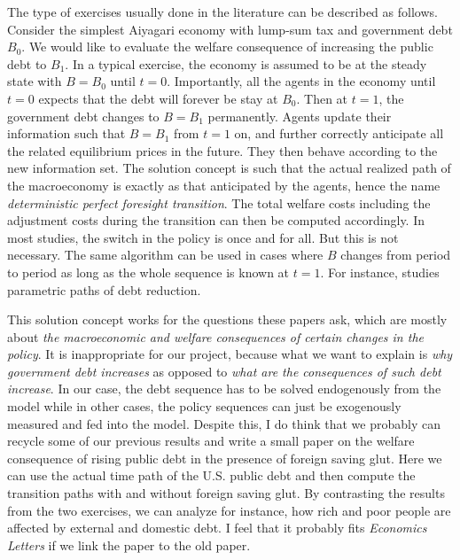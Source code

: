 \documentclass[twoside,11pt,leqno]{article}
\begin{document}
The type of exercises usually done in the literature can be described as follows. Consider the simplest Aiyagari economy with lump-sum tax and government debt $B_0$. We would like to evaluate the welfare consequence of increasing the public debt to $B_1$. In a typical exercise, the economy is assumed to be at the steady state with $B = B_0$ until $t=0$. Importantly, all the agents in the economy until $t=0$ expects that the debt will forever be stay at $B_0$. Then at $t=1$, the government debt changes to $B = B_1$ permanently. Agents update their information such that $B = B_1$ from $t=1$ on, and further correctly anticipate all the related equilibrium prices in the future. They then behave according to the new information set. The solution concept is such that the actual realized path of the macroeconomy is exactly as that anticipated by the agents, hence the name \textit{deterministic perfect foresight transition}. The total welfare costs including the adjustment costs during the transition can then be computed accordingly. In most studies, the switch in the policy is once and for all. But this is not necessary. The same algorithm can be used in cases where $B$ changes from period to period as long as the whole sequence is known at $t=1$. For instance, \citet{RohrsWinter:2017} studies parametric paths of debt reduction.

This solution concept works for the questions these papers ask, which are mostly about \textit{the macroeconomic and welfare consequences of certain changes in the policy}. It is inappropriate for our project, because what we want to explain is \textit{why government debt increases} as opposed to \textit{what are the consequences of such debt increase}. In our case, the debt sequence has to be solved endogenously from the model while in other cases, the policy sequences can just be exogenously measured and fed into the model. Despite this, I do think that we probably can recycle some of our previous \citet{AiyagariMcGrattan:1998} results and write a small paper on the welfare consequence of rising public debt in the presence of foreign saving glut. Here we can use the actual time path of the U.S. public debt and then compute the transition paths with and without foreign saving glut. By contrasting the results from the two exercises, we can analyze for instance, how rich and poor people are affected by external and domestic debt. I feel that it probably fits \textit{Economics Letters} if we link the paper to the old \citet{Diamond:1965} paper.
\end{document}
